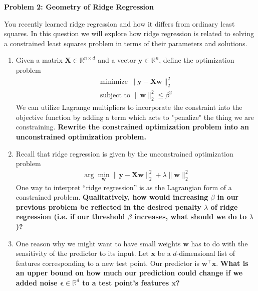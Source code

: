 \documentclass{article}\usepackage[utf8]{inputenc}\usepackage[margin=0.4cm,top=0.4cm,bottom=0.4cm]{geometry}\usepackage[usenames,dvipsnames,svgnames,table]{xcolor}
\begin{document}
\vspace{-2mm}\noindent\begin{mybox}{\begin{center}\textbf{\color{black}Problem 2: Geometry of Ridge Regression}\end{center}}\end{mybox}\vspace{-2mm}
\vspace{10pt}
\noindent You recently learned ridge regression and how it differs from ordinary least squares. In this question we will explore how ridge regression is related to solving a constrained least squares problem in terms of their parameters and solutions.
\begin{enumerate}
\item Given a matrix $\mathbf{X}\in\mathbb{R}^{n\times d}$ and a vector $\mathbf{y}\in\mathbb{R}^n$, define the optimization problem \begin{align*}\text{minimize }\|\mathbf{y}-\mathbf{X}\mathbf{w}\|_2^2\tag{1} \\ \text{subject to }\|\mathbf{w}\|_2^2\leqslant \beta^2\end{align*} We can utilize Lagrange multipliers to incorporate the constraint into the objective function by adding a term which acts to "penalize" the thing we are constraining. \textbf{Rewrite the constrained optimization problem into an unconstrained optimization problem.}
\BeginSolution

\EndSolution
\item Recall that ridge regression is given by the unconstrained optimization problem \begin{align*}\arg\min_\mathbf{w}\|\mathbf{y}-\mathbf{X}\mathbf{w}\|_2^2+\lambda\|\mathbf{w}\|_2^2\tag{2}\end{align*} One way to interpret ``ridge regression'' is as the Lagrangian form of a constrained problem. \textbf{Qualitatively, how would increasing $\beta$ in our previous problem be reflected in the desired penalty $\lambda$ of ridge regression (i.e. if our threshold $\beta$ increases, what should we do to $\lambda$)?}
\BeginSolution

\EndSolution
\item One reason why we might want to have small weights $\mathbf{w}$ has to do with the sensitivity of the predictor to its input. Let $\mathbf{x}$ be a $d$-dimensional list of features corresponding to a new test point. Our predictor is $\mathbf{w}^\top \mathbf{x}$. \textbf{What is an upper bound on how much our prediction could change if we added noise $\mathbf{\epsilon} \in \mathbb{R}^d$ to a test point's features $\mathbf{x}$?}
\BeginSolution


\end{enumerate}
\end{document}
